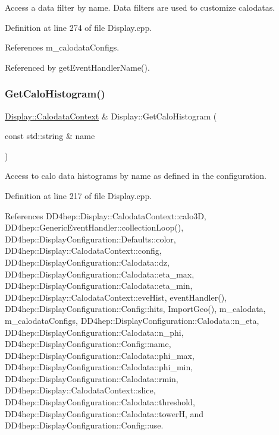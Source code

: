 Access a data filter by name. Data filters are used to customize calodatas. 

Definition at line 274 of file Display.\+cpp.



References m\+\_\+calodata\+Configs.



Referenced by get\+Event\+Handler\+Name().

\hypertarget{class_d_d4hep_1_1_display_a165b8f80e13b8428ec01bde1878f7d0e}{}\label{class_d_d4hep_1_1_display_a165b8f80e13b8428ec01bde1878f7d0e} 
\subsubsection{\texorpdfstring{Get\+Calo\+Histogram()}{GetCaloHistogram()}}
{\footnotesize\ttfamily \hyperlink{struct_d_d4hep_1_1_display_1_1_calodata_context}{Display\+::\+Calodata\+Context} \& Display\+::\+Get\+Calo\+Histogram (\begin{DoxyParamCaption}\item[{const std\+::string \&}]{name }\end{DoxyParamCaption})}



Access to calo data histograms by name as defined in the configuration. 



Definition at line 217 of file Display.\+cpp.



References D\+D4hep\+::\+Display\+::\+Calodata\+Context\+::calo3D, D\+D4hep\+::\+Generic\+Event\+Handler\+::collection\+Loop(), D\+D4hep\+::\+Display\+Configuration\+::\+Defaults\+::color, D\+D4hep\+::\+Display\+::\+Calodata\+Context\+::config, D\+D4hep\+::\+Display\+Configuration\+::\+Calodata\+::dz, D\+D4hep\+::\+Display\+Configuration\+::\+Calodata\+::eta\+\_\+max, D\+D4hep\+::\+Display\+Configuration\+::\+Calodata\+::eta\+\_\+min, D\+D4hep\+::\+Display\+::\+Calodata\+Context\+::eve\+Hist, event\+Handler(), D\+D4hep\+::\+Display\+Configuration\+::\+Config\+::hits, Import\+Geo(), m\+\_\+calodata, m\+\_\+calodata\+Configs, D\+D4hep\+::\+Display\+Configuration\+::\+Calodata\+::n\+\_\+eta, D\+D4hep\+::\+Display\+Configuration\+::\+Calodata\+::n\+\_\+phi, D\+D4hep\+::\+Display\+Configuration\+::\+Config\+::name, D\+D4hep\+::\+Display\+Configuration\+::\+Calodata\+::phi\+\_\+max, D\+D4hep\+::\+Display\+Configuration\+::\+Calodata\+::phi\+\_\+min, D\+D4hep\+::\+Display\+Configuration\+::\+Calodata\+::rmin, D\+D4hep\+::\+Display\+::\+Calodata\+Context\+::slice, D\+D4hep\+::\+Display\+Configuration\+::\+Calodata\+::threshold, D\+D4hep\+::\+Display\+Configuration\+::\+Calodata\+::towerH, and D\+D4hep\+::\+Display\+Configuration\+::\+Config\+::use.



